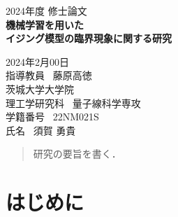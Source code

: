 \documentclass[a4paper,11pt]{jsreport}
\begin{document}
\thispagestyle{empty}
\begin{center}

  \vspace{20mm}
  {\Large\noindent 2024年度 修士論文}\\
  \vspace{40mm}
  {\Huge\noindent\textbf{機械学習を用いた}}\\
  \medskip
  {\Huge\noindent\textbf{イジング模型の臨界現象に関する研究}}\\
  \vspace{\baselineskip}
  \vspace{40mm}

  {\Large\noindent
    2024年2月00日\\
    \vspace{\baselineskip}
    指導教員 \ 藤原高徳    \\
    \vspace{\baselineskip}
    茨城大学大学院\\
    理工学研究科 \ 量子線科学専攻 \\
    \vspace{\baselineskip}
    学籍番号 \ 22NM021S \\
    氏名 \ 須賀 勇貴\\
  }
  \vspace{40mm}

\end{center}

\thispagestyle{empty}
\clearpage

\renewcommand{\abstractname}{要旨}

\begin{abstract}
  研究の要旨を書く．
\end{abstract}

\thispagestyle{empty}
\clearpage


\tableofcontents

\pagestyle{fancy}
\lhead{\rightmark}
\renewcommand{\chaptermark}[1]{\markboth{第\ \normalfont\thechapter\ 章~~#1}{}}
\chapter{はじめに} %
\end{document}
